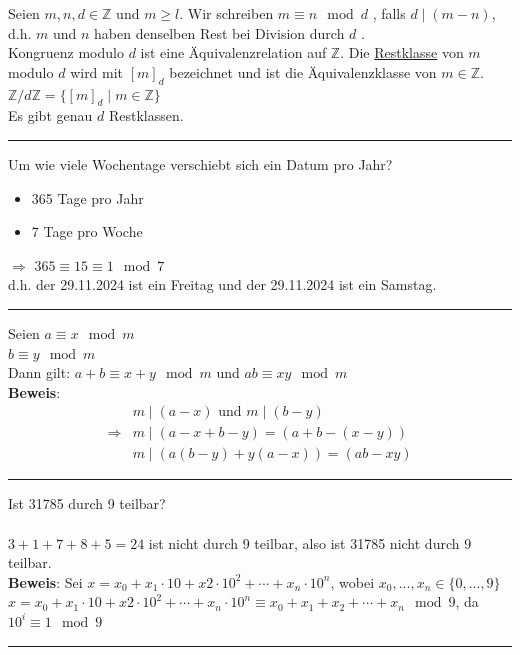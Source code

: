\documentclass[9pt]{article}
\begin{document}
\begin{defi}
Seien $m,n,d \in \mathbb{Z}$ und $m \geq l$. Wir schreiben $m \equiv n \mod d$ , falls $d \mid (m-n)$, d.h. $m$ und $n$ haben denselben Rest bei Division durch $d$ . \\
Kongruenz modulo $d$ ist eine Äquivalenzrelation auf $\mathbb{Z}$.
Die \underline{Restklasse} von $m$ modulo $d$ wird mit $[m]_d$ bezeichnet und ist die Äquivalenzklasse von $m \in \mathbb{Z}$.  \\
$\mathbb{Z} / d\mathbb{Z} = \{[m]_d \mid m \in \mathbb{Z}\}$ \\
Es gibt genau $d$ Restklassen. 
\end{defi} \noindent \rule{8cm}{0.4pt} 
\begin{bsp}
 Um wie viele Wochentage verschiebt sich ein Datum pro Jahr? \\
 \begin{itemize}
     \item 365 Tage pro Jahr 
     \item 7 Tage pro Woche 
 \end{itemize}
 $\Rightarrow$ $365 \equiv 15 \equiv 1 \mod 7$\\
 d.h. der 29.11.2024 ist ein Freitag und der 29.11.2024 ist ein Samstag. 
\end{bsp} \noindent \rule{8cm}{0.4pt}
\begin{satz} \label{satz-8-9}
Seien $a \equiv x \mod m$\\
$b \equiv y \mod m$ \\
Dann gilt: $a+b \equiv x+y \mod m$ und $ab \equiv xy \mod m$\\
\textbf{Beweis}: 
\begin{align*}
   &  m \mid  (a-x) \text{ und } m \mid (b-y) \\
    \Rightarrow &  m \mid (a-x+b-y) = (a+b-(x-y)) \\
    & m \mid (a(b-y)+y(a-x)) = (ab-xy)
\end{align*}
 \end{satz} \noindent \rule{8cm}{0.4pt}
\begin{bsp}
Ist 31785 durch 9 teilbar? \\
\\
$3+1+7+8+5=24$ ist nicht durch 9 teilbar, also ist  31785 nicht durch 9 teilbar. \\
\textbf{Beweis}: Sei $x = x_0 + x_1 \cdot 10 + x2 \cdot 10^2 + \cdots + x_n \cdot 10^n$, wobei $x_0, ..., x_n \in \{0,...,9\}$ \\
$x = x_0 + x_1 \cdot 10 + x2 \cdot 10^2 + \cdots + x_n \cdot 10^n \equiv x_0 + x_1 + x_2 + \cdots + x_n \mod 9$, da $10^i \equiv 1 \mod 9$
\end{bsp} \noindent \rule{8cm}{0.4pt} \\
\end{document}
